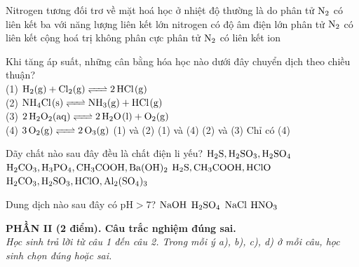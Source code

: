 \documentclass[11pt,a4paper]{article}
\begin{document}
\begin{ex}
Nitrogen tương đối trơ về mặt hoá học ở nhiệt độ thường là do
\choice
{\True phân tử $\ce{N2}$ có liên kết ba với năng lượng liên kết lớn}
{nitrogen có độ âm điện lớn}
{phân tử $\ce{N2}$ có liên kết cộng hoá trị không phân cực}
{phân tử $\ce{N2}$ có liên kết ion}
\end{ex}
\begin{ex}
Khi tăng áp suất, những cân bằng hóa học nào dưới đây chuyển dịch theo chiều thuận?\\
(1) $\ce{H2(g) + Cl2(g) <=> 2HCl(g)}$\\
(2) $\ce{NH4Cl(s) <=> NH3(g) + HCl(g)}$\\
(3) $\ce{2H2O2(aq) <=> 2H2O(l) + O2(g)}$\\
(4) $\ce{3O2(g) <=> 2O3(g)}$
\choice
{(1) và (2)}
{(1) và (4)}
{(2) và (3)}
{\True Chỉ có (4)}
\end{ex}
\begin{ex}
Dãy chất nào sau đây đều là chất điện li yếu?
\choice
{$\ce{H2S}, \ce{H2SO3}, \ce{H2SO4}$}
{$\ce{H2CO3}, \ce{H3PO4}, \ce{CH3COOH}, \ce{Ba(OH)2}$}
{\True $\ce{H2S}, \ce{CH3COOH}, \ce{HClO}$}
{$\ce{H2CO3}, \ce{H2SO3}, \ce{HClO}, \ce{Al2(SO4)3}$}
\end{ex}
\begin{ex}
Dung dịch nào sau đây có $\text{pH} > 7$?
\choice
{\True $\ce{NaOH}$}
{$\ce{H2SO4}$}
{$\ce{NaCl}$}
{$\ce{HNO3}$}
\end{ex}
\vspace{4pt}
\noindent
{\color{mainGreen}\textbf{\Large PHẦN II (2 điểm). Câu trắc nghiệm đúng sai.}}\\
\textit{\small Học sinh trả lời từ câu 1 đến câu 2. Trong mỗi ý a), b), c), d) ở mỗi câu, học sinh chọn đúng hoặc sai.}
\vspace{2pt}
\end{document}
